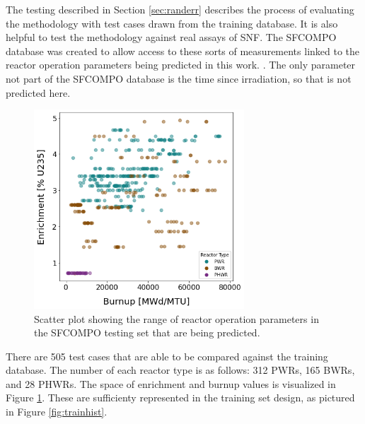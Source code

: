 
The testing described in Section \ref{sec:randerr} describes the process of
evaluating the methodology with test cases drawn from the training database.
It is also helpful to test the methodology against real assays of \gls{SNF}.
The \gls{SFCOMPO} database was created to allow access to these sorts of
measurements linked to the reactor operation parameters being predicted in this
work. \cite{sfcompo}. The only parameter not part of the \gls{SFCOMPO} database
is the time since irradiation, so that is not predicted here. 

\begin{figure}[!htb]
  \centering
  \includegraphics[width=0.7\textwidth]{./chapters/exp1/sfcompo_scatter_viz.png}
  \caption{Scatter plot showing the range of reactor operation parameters in 
           the \gls{SFCOMPO} testing set that are being predicted.}
  \label{fig:sfcoscatter}
\end{figure}

There are 505 test cases that are able to be compared against the training
database.  The number of each reactor type is as follows: 312 \gls{PWR}s, 165
\gls{BWR}s, and 28 \gls{PHWR}s. The space of enrichment and burnup values is
visualized in Figure \ref{fig:sfcoscatter}. These are sufficienty represented
in the training set design, as pictured in Figure \ref{fig:trainhist}.

